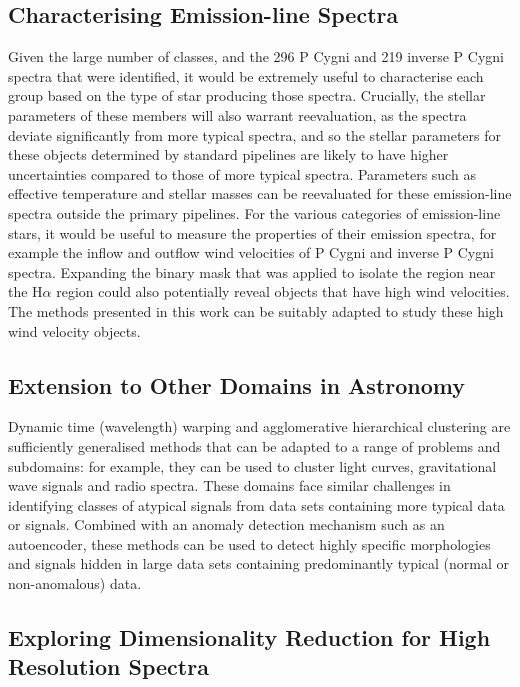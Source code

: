 \subsection{Characterising Emission-line Spectra}

Given the large number of classes, and the 296 P Cygni and 219 inverse P Cygni spectra that were identified, it would be extremely useful to characterise each group based on the type of star producing those spectra. Crucially, the stellar parameters of these members will also warrant reevaluation, as the spectra deviate significantly from more typical spectra, and so the stellar parameters for these objects determined by standard pipelines are likely to have higher uncertainties compared to those of more typical spectra. Parameters such as effective temperature and stellar masses can be reevaluated for these emission-line spectra outside the primary pipelines. For the various categories of emission-line stars, it would be useful to measure  the properties of their emission spectra, for example the inflow and outflow wind velocities of P Cygni and inverse P Cygni spectra. Expanding the binary mask that was applied to isolate the region near the H$\alpha$ region could also potentially reveal objects that have high wind velocities. The methods presented in this work can be suitably adapted to study these high wind velocity objects.

\subsection{Extension to Other Domains in Astronomy}

Dynamic time (wavelength) warping and agglomerative hierarchical clustering are sufficiently generalised methods that can be adapted to a range of problems and subdomains: for example, they can be used to cluster light curves, gravitational wave signals and radio spectra. These domains face similar challenges in identifying classes of atypical signals from data sets containing more typical data or signals. Combined with an anomaly detection mechanism such as an autoencoder, these methods can be used to detect highly specific morphologies and signals hidden in large data sets containing predominantly typical (normal or non-anomalous) data. 

\subsection{Exploring Dimensionality Reduction for High Resolution Spectra}

